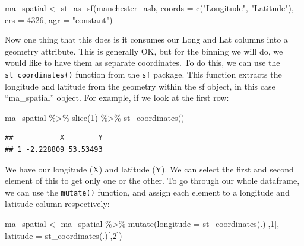 \documentclass[
]{book}
\newenvironment{Shaded}{\begin{snugshade}}{\end{snugshade}}
\newcommand{\AttributeTok}[1]{\textcolor[rgb]{0.77,0.63,0.00}{#1}}
\newcommand{\DecValTok}[1]{\textcolor[rgb]{0.00,0.00,0.81}{#1}}
\newcommand{\FunctionTok}[1]{\textcolor[rgb]{0.00,0.00,0.00}{#1}}
\newcommand{\NormalTok}[1]{#1}
\newcommand{\OtherTok}[1]{\textcolor[rgb]{0.56,0.35,0.01}{#1}}
\newcommand{\SpecialCharTok}[1]{\textcolor[rgb]{0.00,0.00,0.00}{#1}}
\newcommand{\StringTok}[1]{\textcolor[rgb]{0.31,0.60,0.02}{#1}}
\begin{document}
\begin{Shaded}
\begin{Highlighting}[]
\NormalTok{ma\_spatial }\OtherTok{\textless{}{-}} \FunctionTok{st\_as\_sf}\NormalTok{(manchester\_asb, }\AttributeTok{coords =} \FunctionTok{c}\NormalTok{(}\StringTok{"Longitude"}\NormalTok{, }\StringTok{"Latitude"}\NormalTok{), }
                 \AttributeTok{crs =} \DecValTok{4326}\NormalTok{, }\AttributeTok{agr =} \StringTok{"constant"}\NormalTok{)}
\end{Highlighting}
\end{Shaded}

Now one thing that this does is it consumes our Long and Lat columns into a geometry attribute. This is generally OK, but for the binning we will do, we would like to have them as separate coordinates. To do this, we can use the \texttt{st\_coordinates()} function from the \texttt{sf} package. This function extracts the longitude and latitude from the geometry within the sf object, in this case ``ma\_spatial'' object. For example, if we look at the first row:

\begin{Shaded}
\begin{Highlighting}[]
\NormalTok{ma\_spatial }\SpecialCharTok{\%\textgreater{}\%} 
  \FunctionTok{slice}\NormalTok{(}\DecValTok{1}\NormalTok{) }\SpecialCharTok{\%\textgreater{}\%} 
  \FunctionTok{st\_coordinates}\NormalTok{()}
\end{Highlighting}
\end{Shaded}

\begin{verbatim}
##           X        Y
## 1 -2.228809 53.53493
\end{verbatim}

We have our longitude (X) and latitude (Y). We can select the first and second element of this to get only one or the other. To go through our whole dataframe, we can use the \texttt{mutate()} function, and assign each element to a longitude and latitude column respectively:

\begin{Shaded}
\begin{Highlighting}[]
\NormalTok{ma\_spatial }\OtherTok{\textless{}{-}}\NormalTok{ ma\_spatial }\SpecialCharTok{\%\textgreater{}\%} 
  \FunctionTok{mutate}\NormalTok{(}\AttributeTok{longitude =} \FunctionTok{st\_coordinates}\NormalTok{(.)[,}\DecValTok{1}\NormalTok{],}
         \AttributeTok{latitude =} \FunctionTok{st\_coordinates}\NormalTok{(.)[,}\DecValTok{2}\NormalTok{])}
\end{Highlighting}
\end{Shaded}
\end{document}

